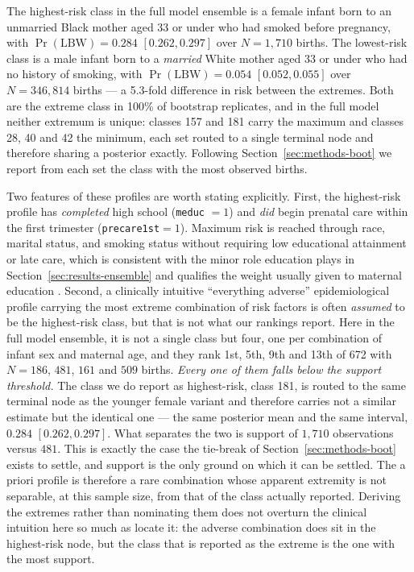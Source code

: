 \documentclass[AMA]{USG}
\begin{document}
The highest-risk class in the full model ensemble is a female infant born to an unmarried Black mother aged 33 or under who had smoked before pregnancy, with \(\Pr(\mathrm{LBW}) = 0.284\) \([0.262,0.297]\) over \(N=1,710\) births. The lowest-risk class is a male infant born to a \emph{married} White mother aged 33 or under who had no history of smoking, with \(\Pr(\mathrm{LBW}) = 0.054\) \([0.052, 0.055]\) over \(N=346,814\) births --- a 5.3-fold difference in risk between the extremes. Both are the extreme class in 100\% of bootstrap replicates, and in the full model neither extremum is unique: classes 157 and 181 carry the maximum and classes 28, 40 and 42 the minimum, each set routed to a single terminal node and therefore sharing a posterior exactly. Following Section~\ref{sec:methods-boot} we report from each set the class with the most observed births.


Two features of these profiles are worth stating explicitly. First, the highest-risk profile has \emph{completed} high school (\texttt{meduc} $=1$) and \emph{did} begin prenatal care within the first trimester (\texttt{precare1st}$=1$). Maximum risk is reached through race, marital status, and smoking status without requiring low educational attainment or late care, which is consistent with the minor role education plays in Section~\ref{sec:results-ensemble} and qualifies the weight usually given to maternal education \cite{edu_lbw}. Second, a clinically intuitive ``everything adverse'' epidemiological profile carrying the most extreme combination of risk factors is often \emph{assumed} to be the highest-risk class, but that is not what our rankings report. Here in the full model ensemble, it is not a single class but four, one per combination of infant sex and maternal age, and they rank 1st, 5th, 9th and 13th of 672 with \(N=186\), \(481\), \(161\) and \(509\) births. \emph{Every one of them falls below the support threshold.} The class we do report as highest-risk, class 181, is routed to the same terminal node as the younger female variant and therefore carries not a similar estimate but the identical one --- the same posterior mean and the same interval, $0.284$ $[0.262, 0.297]$. What separates the two is support of $1,710$ observations versus $481$. This is exactly the case the tie-break of Section~\ref{sec:methods-boot} exists to settle, and support is the only ground on which it can be settled. The a priori profile is therefore a rare combination whose apparent extremity is not separable, at this sample size, from that of the class actually reported. Deriving the extremes rather than nominating them does not overturn the clinical intuition here so much as locate it: the adverse combination does sit in the highest-risk node, but the class that is reported as the extreme is the one with the most support.
\end{document}
